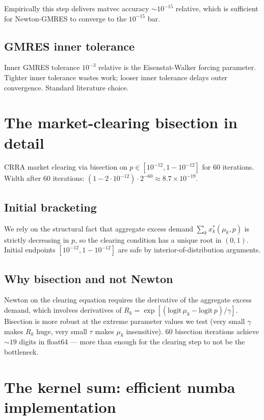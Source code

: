 \documentclass[11pt]{article}
\newcommand{\1}{\mathbf{1}}
\begin{document}
Empirically this step delivers matvec accuracy $\sim 10^{-15}$ relative,
which is sufficient for Newton-GMRES to converge to the $10^{-15}$ bar.

\subsection{GMRES inner tolerance}

Inner GMRES tolerance $10^{-3}$ relative is the Eisenstat-Walker forcing
parameter.  Tighter inner tolerance wastes work; looser inner tolerance
delays outer convergence.  Standard literature choice.

\section{The market-clearing bisection in detail}

CRRA market clearing via bisection on $p \in [10^{-12}, 1 - 10^{-12}]$
for 60 iterations.  Width after 60 iterations: $(1 - 2 \cdot 10^{-12})
\cdot 2^{-60} \approx 8.7 \times 10^{-19}$.

\subsection{Initial bracketing}

We rely on the structural fact that aggregate excess demand
$\sum_k x_k^*(\mu_k, p)$ is strictly decreasing in $p$, so the
clearing condition has a unique root in $(0, 1)$.  Initial endpoints
$[10^{-12}, 1-10^{-12}]$ are safe by interior-of-distribution
arguments.

\subsection{Why bisection and not Newton}

Newton on the clearing equation requires the derivative of the
aggregate excess demand, which involves derivatives of $R_k = \exp[(\mathrm{logit}\,\mu_k - \mathrm{logit}\,p)/\gamma]$.  Bisection is more robust at the
extreme parameter values we test (very small $\gamma$ makes $R_k$
huge, very small $\tau$ makes $\mu_k$ insensitive).  60 bisection
iterations achieve $\sim 19$ digits in float64 — more than enough for
the clearing step to not be the bottleneck.

\section{The kernel sum: efficient numba implementation}
\end{document}
